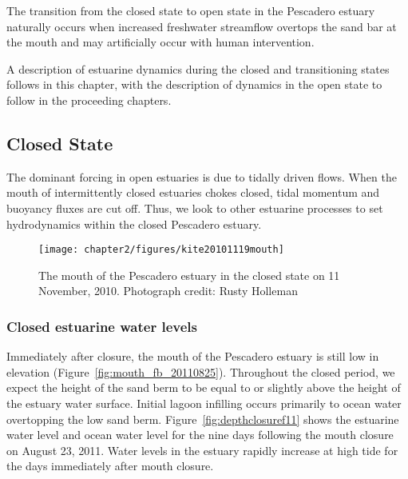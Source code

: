 The transition from the closed state to open state in the Pescadero estuary naturally occurs when increased freshwater streamflow overtops the sand bar at the mouth and may artificially occur with human intervention. 

A description of estuarine dynamics during the closed and transitioning states follows in this chapter, with the description of dynamics in the open state to follow in the proceeding chapters.


\subsection{Closed State} \label{ssec:ClosedDynamics}

The dominant forcing in open estuaries is due to tidally driven flows. When the mouth of intermittently closed estuaries chokes closed, tidal momentum and buoyancy fluxes are cut off. Thus, we look to other estuarine processes to set hydrodynamics within the closed Pescadero estuary. 

\begin{figure}[h!]
	\begin{center}
		\texttt{[image: chapter2/figures/kite20101119mouth]} 
	\end{center}
\caption{The mouth of the Pescadero estuary in the closed state on 11 November, 2010.  Photograph credit: Rusty Holleman}\label{fig:kite_photos_closed} \end{figure}



\subsubsection{Closed estuarine water levels} \label{cl_wl}
Immediately after closure, the mouth of the Pescadero estuary is still low in elevation (Figure~\ref{fig:mouth_fb_20110825}). Throughout the closed period, we expect the height of the sand berm to be equal to or slightly above the height of the estuary water surface. Initial lagoon infilling occurs primarily to ocean water overtopping the low sand berm. Figure~\ref{fig:depthclosuref11} shows the estuarine water level and ocean water level for the nine days following the mouth closure on August 23, 2011. Water levels in the estuary rapidly increase at high tide for the days immediately after mouth closure.  


